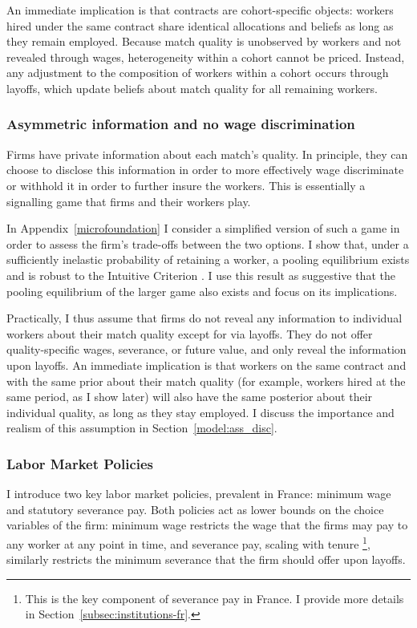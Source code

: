 An immediate implication is that contracts are cohort-specific objects: workers hired under the same contract share identical allocations and beliefs as long as they remain employed. Because match quality is unobserved by workers and not revealed through wages, heterogeneity within a cohort cannot be priced. Instead, any adjustment to the composition of workers within a cohort occurs through layoffs, which update beliefs about match quality for all remaining workers.

\subsubsection*{Asymmetric information and no wage discrimination}
Firms have private information about each match's quality. In principle, they can choose to disclose this information in order to more effectively wage discriminate or withhold it in order to further insure the workers. This is essentially a signalling game that firms and their workers play.

In Appendix~\ref{microfoundation} I consider a simplified version of such a game in order to assess the firm's trade-offs between the two options. I show that, under a sufficiently inelastic probability of retaining a worker, a pooling equilibrium exists and is robust to the Intuitive Criterion \parencite{Cho1987}. I use this result as suggestive that the pooling equilibrium of the larger game also exists and focus on its implications. 

Practically, I thus assume that firms do not reveal any information to individual workers about their match quality except for via layoffs. They do not offer quality-specific wages, severance, or future value, and only reveal the information upon layoffs. An immediate implication is that workers on the same contract and with the same prior about their match quality (for example, workers hired at the same period, as I show later) will also have the same posterior about their individual quality, as long as they stay employed. I discuss the importance and realism of this assumption in Section~\ref{model:ass_disc}.

\subsubsection*{Labor Market Policies}
I introduce two key labor market policies, prevalent in France: minimum wage and statutory severance pay. Both policies act as lower bounds on the choice variables of the firm: minimum wage restricts the wage that the firms may pay to any worker at any point in time, and severance pay, scaling with tenure \footnote{This is the key component of severance pay in France. I provide more details in Section~\ref{subsec:institutions-fr}.}, similarly restricts the minimum severance that the firm should offer upon layoffs.

